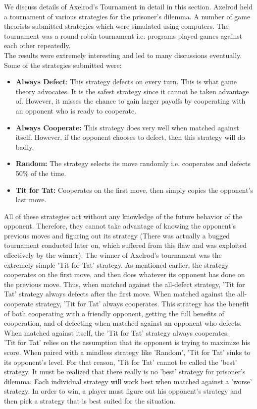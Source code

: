 \documentclass[a4paper]{article}
\begin{document}
	We discuss details of Axelrod's Tournament in detail in this section. Axelrod held a tournament of various strategies for the prisoner's dilemma. A number of game theorists submitted strategies which were simulated using computers. The tournament was a round robin tournament i.e. programs played games against each other repeatedly.\\
	The results were extremely interesting and led to many discussions eventually. Some of the strategies submitted were:
	\begin{itemize}
	\item \textbf{Always Defect}: This strategy defects on every turn. This is what game theory advocates. It is the safest strategy since it cannot be taken advantage of. However, it misses the chance to gain larger payoffs by cooperating with an opponent who is ready to cooperate.
	\item \textbf{Always Cooperate:} This strategy does very well when matched against itself. However, if the opponent chooses to defect, then this strategy will do badly.
	\item \textbf{Random:} The strategy selects its move randomly i.e. cooperates and defects 50\% of the time.
	\item \textbf{Tit for Tat:} Cooperates on the first move, then simply copies the opponent's last move.
	\end{itemize}
	
	All of these strategies act without any knowledge of the future behavior of the opponent. Therefore, they cannot take advantage of knowing the opponent's previous moves and figuring out its strategy (There was actually a bugged tournament conducted later on, which suffered from this flaw and was exploited effectively by the winner). The winner of Axelrod's tournament was the extremely simple 'Tit for Tat' strategy. As mentioned earlier, the strategy cooperates on the first move, and then does whatever its opponent has done on the previous move. Thus, when matched against the all-defect strategy, 'Tit for Tat' strategy always defects after the first move. When matched against the all-cooperate strategy, 'Tit for Tat' always cooperates. This strategy has the benefit of both cooperating with a friendly opponent, getting the full benefits of cooperation, and of defecting when matched against an opponent who defects. When matched against itself, the 'Tit for Tat' strategy always cooperates.\\
	'Tit for Tat' relies on the assumption that its opponent is trying to maximize his score. When paired with a mindless strategy like 'Random', 'Tit for Tat' sinks to its opponent's level. For that reason, 'Tit for Tat' cannot be called the 'best' strategy. It must be realized that there really is no 'best' strategy for prisoner's dilemma. Each individual strategy will work best when matched against a 'worse' strategy. In order to win, a player must figure out his opponent's strategy and then pick a strategy that is best suited for the situation.
	
\end{document}

